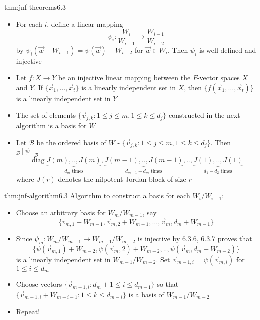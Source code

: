\documentclass[landscape, 8pt]{extarticle}
\DeclareMathOperator{\diag}{diag}
\begin{document}
\begin{multicols}{3}
\begin{thm}{thm:jnf-theorems}{6.3}
    \begin{itemize}
        \setlength\itemsep{0em}
        \item[\textbf{6.3.6}:] For each $i$, define a linear mapping
            \[\psi_{i} : \frac{W_{i}}{W_{i - 1}} \to \frac{W_{i - 1}}{W_{i - 2}}\]
            by $\psi_{i}(\vec{w} + W_{i - 1}) = \psi(\vec{w}) + W_{i - 2}$ for $\vec{w}\in W_{i}$. Then $\psi_{i}$ is well-defined and injective
        \item[\textbf{6.3.7}:] Let $f : X \to Y$ be an injective linear mapping between the $F$-vector spaces $X$ and $Y$. If $\{\vec{x}_{1},\dots,\vec{x}_{t}\}$ is a linearly independent set in $X$, then $\{f(\vec{x}_{1},\dots,\vec{x}_{t})\}$ is a linearly independent set in $Y$
        \item[\textbf{6.3.8}:] The set of elements $\{\vec{v}_{j,k} : 1 \le j \le m, 1 \le k \le d_{j}\}$ constructed in the next algorithm is a basis for $W$
        \item[\textbf{6.3.9}:] Let $\mathcal{B}$ be the ordered basis of $W$ - $\{\vec{v}_{j,k} : 1 \le j \le m, 1 \le k \le d_{j}\}$. Then ${}_{\mathcal{B}}[\psi]_{\mathcal{B}} = $
            \[\diag \underbrace{J(m),. .,J(m)}_{\text{$d_{m}$ times}}, \underbrace{J(m-1),. .,J(m-1)}_{\text{$d_{m - 1} - d_{m}$ times}},. .,\underbrace{J(1), . .,J(1)}_{\text{$d_{1} - d_{2}$ times}}\]
            where $J(r)$ denotes the nilpotent Jordan block of size $r$
    \end{itemize}
\end{thm}


\begin{thm}{thm:jnf-algorithm}{6.3}
    Algorithm to construct a basis for each $W_{i} / W_{i - 1}$:
    \begin{itemize}[]
        \item Choose an arbitrary basis for $W_{m} / W_{m - 1}$, say
            \[\{v_{m, 1} + W_{m - 1}, \vec{v}_{m, 2} + W_{m - 1},\dots,\vec{v}_{m}, d_{m} + W_{m - 1}\}\]
        \item Since $\psi_{m} : W_{m} / W_{m - 1} \to W_{m - 1} / W_{m - 2}$ is injective by 6.3.6, 6.3.7 proves that 
            \[\{\psi(\vec{v}_{m,1}) + W_{m - 2}, \psi(\vec{v}_{m}, 2) + W_{m - 2}, . . ,\psi(\vec{v}_{m}, d_{m} + W_{m - 2})\}\]
            is a linearly independent set in $W_{m - 1} / W_{m - 2}$. Set $\vec{v}_{m - 1, i} = \psi(\vec{v}_{m, i})$ for $1 \le i \le d_{m}$
        \item Choose vectors $\{\vec{v}_{m - 1, i} : d_{m} + 1 \le i \le d_{m - 1}\}$ so that $\{\vec{v}_{m - 1, i} + W_{m - i - 1} : 1 \le k \le d_{m - i}\}$ is a basis of $W_{m - 1} / W_{m - 2}$
        \item Repeat!
    \end{itemize}
\end{thm}

\lipsum[1-7]

\end{multicols}
\end{document}
